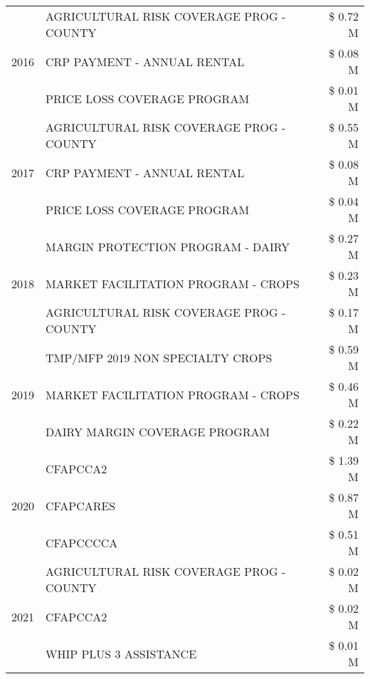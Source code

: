 \begin{tabular}{llr}
\multirow[t]{3}{*}{2016} & AGRICULTURAL RISK COVERAGE PROG - COUNTY & \$ 0.72 M \\
 & CRP PAYMENT - ANNUAL RENTAL & \$ 0.08 M \\
 & PRICE LOSS COVERAGE PROGRAM & \$ 0.01 M \\
\cline{1-3}
\multirow[t]{3}{*}{2017} & AGRICULTURAL RISK COVERAGE PROG - COUNTY & \$ 0.55 M \\
 & CRP PAYMENT - ANNUAL RENTAL & \$ 0.08 M \\
 & PRICE LOSS COVERAGE PROGRAM & \$ 0.04 M \\
\cline{1-3}
\multirow[t]{3}{*}{2018} & MARGIN PROTECTION PROGRAM - DAIRY & \$ 0.27 M \\
 & MARKET FACILITATION PROGRAM - CROPS & \$ 0.23 M \\
 & AGRICULTURAL RISK COVERAGE PROG - COUNTY & \$ 0.17 M \\
\cline{1-3}
\multirow[t]{3}{*}{2019} & TMP/MFP 2019 NON SPECIALTY CROPS & \$ 0.59 M \\
 & MARKET FACILITATION PROGRAM - CROPS & \$ 0.46 M \\
 & DAIRY MARGIN COVERAGE PROGRAM & \$ 0.22 M \\
\cline{1-3}
\multirow[t]{3}{*}{2020} & CFAPCCA2 & \$ 1.39 M \\
 & CFAPCARES & \$ 0.87 M \\
 & CFAPCCCCA & \$ 0.51 M \\
\cline{1-3}
\multirow[t]{3}{*}{2021} & AGRICULTURAL RISK COVERAGE PROG - COUNTY & \$ 0.02 M \\
 & CFAPCCA2 & \$ 0.02 M \\
 & WHIP PLUS 3 ASSISTANCE & \$ 0.01 M \\
\cline{1-3}
\bottomrule
\end{tabular}
